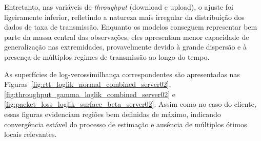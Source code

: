 \documentclass{article}
\begin{document}
Entretanto, nas variáveis de \textit{throughput} (download e upload),
o ajuste foi ligeiramente inferior, refletindo a natureza mais irregular
da distribuição dos dados de taxa de transmissão.
Enquanto os modelos conseguem representar bem parte da massa central das observações,
eles apresentam menor capacidade de generalização nas extremidades,
provavelmente devido à grande dispersão e à presença de múltiplos regimes de transmissão
ao longo do tempo.

As superfícies de log-verossimilhança correspondentes são apresentadas nas
Figuras~\ref{fig:rtt_loglik_normal_combined_server02},
\ref{fig:throughput_gamma_loglik_combined_server02}
e \ref{fig:packet_loss_loglik_surface_beta_server02}.
Assim como no caso do cliente, essas figuras evidenciam regiões bem definidas de máximo,
indicando convergência estável do processo de estimação e ausência de múltiplos ótimos locais relevantes.
\end{document}
